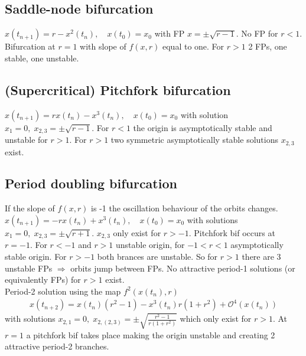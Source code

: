 \subsection{Saddle-node bifurcation}
$x(t_{n+1})=r-x^2(t_n), \quad x(t_0)=x_0$ with FP $x=\pm \sqrt{r-1}$. No FP for $r<1$. Bifurcation at $r=1$ with slope of $f(x,r)$ equal to one. For $r>1$ 2 FPs, one stable, one unstable.
\subsection{(Supercritical) Pitchfork bifurcation}
$x(t_{n+1})=rx(t_n)-x^3(t_n), \quad x(t_0)=x_0$ with solution $x_1=0,\; x_{2,3}=\pm \sqrt{r-1}$. For $r<1$ the origin is asymptotically stable and unstable for $r>1$. For $r>1$ two symmetric asymptotically stable solutions $x_{2,3}$ exist.
\subsection{Period doubling bifurcation}
If the slope of $f(x,r)$ is -1 the oscillation behaviour of the orbits changes.\\
$x(t_{n+1})=-rx(t_n)+x^3(t_n), \quad x(t_0)=x_0$ with solutions $x_1=0, \; x_{2,3}=\pm\sqrt{r+1}$. $x_{2,3}$ only exist for $r>-1$. Pitchfork bif occurs at $r=-1$. For $r<-1$ and $r>1$ unstable origin, for $-1<r<1$ asymptotically stable origin. For $r>-1$ both brances are unstable. So for $r>1$ there are 3 unstable FPs $\Rightarrow$ orbits jump between FPs. No attractive period-1 solutions (or equivalently FPs) for $r>1$ exist.\\
Period-2 solution using the map $f^2(x(t_n),r)$
\begin{align*}
x(t_{n+2})=x(t_n)(r^2-1)- x^3(t_n)r(1+r^2) + \mathcal{O}^4(x(t_n))
\end{align*}
with solutions $x_{2,1}=0, \; x_{2,(2,3)} = \pm \sqrt{\frac{r^2-1}{r(1+r^2)}}$ which only exist for $r>1$. At $r=1$ a pitchfork bif takes place making the origin unstable and creating 2 attractive period-2 branches.

\begin{center}
\end{center}

